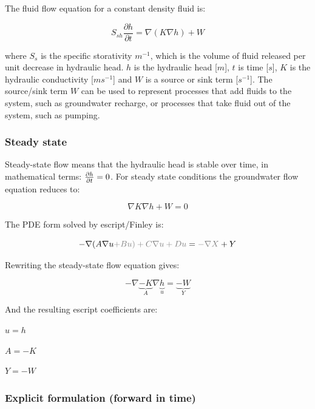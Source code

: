 \documentclass[11pt]{article}
\begin{document}
The fluid flow equation for a constant density fluid is:  

\begin{equation}
	  S_{sh}  \frac{\partial h}{\partial t} = \nabla ( K  \nabla h ) + W
\end{equation}

where $S_{s}$ is the specific storativity $m^{-1}$, which is the volume of fluid released per unit decrease in hydraulic head. $h$ is the hydraulic head [$m$], $t$ is time [$s$], $K$ is the hydraulic conductivity [$m s^{-1}$] and $W$ is a source or sink term [$s^{-1}$]. The source/sink term $W$  can be used to represent processes that add fluids to the system, such as groundwater recharge, or processes that take fluid out of the system, such as pumping.  


\subsubsection{Steady state}

Steady-state flow means that the hydraulic head is stable over time, in mathematical terms: ${\partial h \over{\partial t}} = 0$. For steady state conditions the groundwater flow equation reduces to:

\begin{equation}
	   \nabla K  \nabla h + W = 0
\end{equation}

The PDE form solved by escript/Finley is:

\begin{equation}
    - \nabla (A \nabla u {\color{gray} + B u ) + C \nabla u + D u} = {\color{gray} - \nabla X} + Y
\end{equation}

Rewriting the steady-state flow equation gives:
 
\begin{equation}
	   - \nabla \underbrace{-K}_A  \nabla \underbrace{h}_u =  \underbrace{-W}_Y
\end{equation}

And the resulting escript coefficients are: 

$ u = h $

$ A = - K $

$ Y = - W $


\subsubsection{Explicit formulation (forward in time)}
\end{document}
